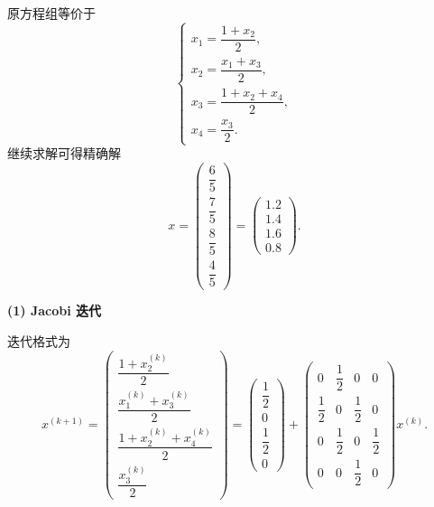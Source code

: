 \documentclass[11pt, a4paper]{ctexart}
\begin{document}
\begin{solution}
    原方程组等价于
    \[
        \begin{cases}
            x_1 = \dfrac{1 + x_2}{2}, \\
            x_2 = \dfrac{x_1 + x_3}{2}, \\
            x_3 = \dfrac{1 + x_2 + x_4}{2}, \\
            x_4 = \dfrac{x_3}{2}.
        \end{cases}
    \]
    继续求解可得精确解
    \[
        x =
        \begin{pmatrix}
            \dfrac{6}{5} \\
            \dfrac{7}{5} \\
            \dfrac{8}{5} \\
            \dfrac{4}{5}
        \end{pmatrix}
        =
        \begin{pmatrix}
            1.2 \\
            1.4 \\
            1.6 \\
            0.8
        \end{pmatrix}.
    \]

    \textbf{(1) Jacobi 迭代}

    迭代格式为
    \[
        x^{(k+1)}
        =
        \begin{pmatrix}
            \dfrac{1 + x_2^{(k)}}{2} \\
            \dfrac{x_1^{(k)} + x_3^{(k)}}{2} \\
            \dfrac{1 + x_2^{(k)} + x_4^{(k)}}{2} \\
            \dfrac{x_3^{(k)}}{2}
        \end{pmatrix}
        =
        \begin{pmatrix}
            \dfrac{1}{2} \\
            0 \\
            \dfrac{1}{2} \\
            0
        \end{pmatrix}
        +
        \begin{pmatrix}
            0 & \dfrac{1}{2} & 0 & 0 \\
            \dfrac{1}{2} & 0 & \dfrac{1}{2} & 0 \\
            0 & \dfrac{1}{2} & 0 & \dfrac{1}{2} \\
            0 & 0 & \dfrac{1}{2} & 0
        \end{pmatrix}
        x^{(k)}.
    \]


\end{solution}
\end{document}
